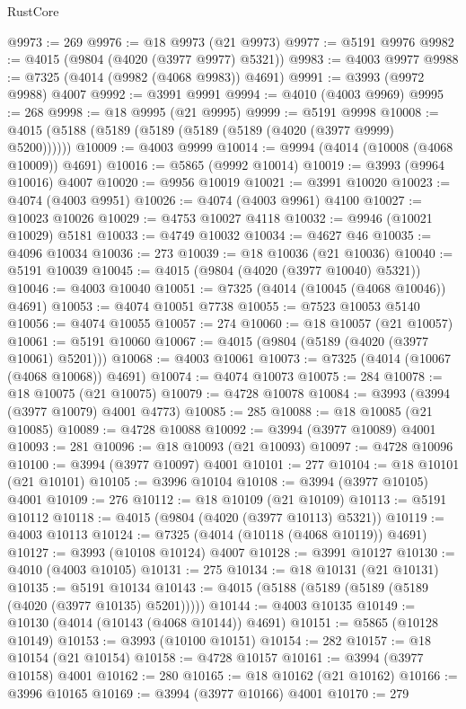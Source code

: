 \begin{lexlean}{RustCore}
\begin{coremodule}
@9973 := 269
@9976 := @18 @9973 (@21 @9973)
@9977 := @5191 @9976
@9982 := @4015 (@9804 (@4020 (@3977 @9977) @5321))
@9983 := @4003 @9977
@9988 := @7325 (@4014 (@9982 (@4068 @9983)) @4691)
@9991 := @3993 (@9972 @9988) @4007
@9992 := @3991 @9991
@9994 := @4010 (@4003 @9969)
@9995 := 268
@9998 := @18 @9995 (@21 @9995)
@9999 := @5191 @9998
@10008 := @4015 (@5188 (@5189 (@5189 (@5189 (@5189 (@4020 (@3977 @9999) @5200))))))
@10009 := @4003 @9999
@10014 := @9994 (@4014 (@10008 (@4068 @10009)) @4691)
@10016 := @5865 (@9992 @10014)
@10019 := @3993 (@9964 @10016) @4007
@10020 := @9956 @10019
@10021 := @3991 @10020
@10023 := @4074 (@4003 @9951)
@10026 := @4074 (@4003 @9961) @4100
@10027 := @10023 @10026
@10029 := @4753 @10027 @4118
@10032 := @9946 (@10021 @10029) @5181
@10033 := @4749 @10032
@10034 := @4627 @46
@10035 := @4096 @10034
@10036 := 273
@10039 := @18 @10036 (@21 @10036)
@10040 := @5191 @10039
@10045 := @4015 (@9804 (@4020 (@3977 @10040) @5321))
@10046 := @4003 @10040
@10051 := @7325 (@4014 (@10045 (@4068 @10046)) @4691)
@10053 := @4074 @10051 @7738
@10055 := @7523 @10053 @5140
@10056 := @4074 @10055
@10057 := 274
@10060 := @18 @10057 (@21 @10057)
@10061 := @5191 @10060
@10067 := @4015 (@9804 (@5189 (@4020 (@3977 @10061) @5201)))
@10068 := @4003 @10061
@10073 := @7325 (@4014 (@10067 (@4068 @10068)) @4691)
@10074 := @4074 @10073
@10075 := 284
@10078 := @18 @10075 (@21 @10075)
@10079 := @4728 @10078
@10084 := @3993 (@3994 (@3977 @10079) @4001 @4773)
@10085 := 285
@10088 := @18 @10085 (@21 @10085)
@10089 := @4728 @10088
@10092 := @3994 (@3977 @10089) @4001
@10093 := 281
@10096 := @18 @10093 (@21 @10093)
@10097 := @4728 @10096
@10100 := @3994 (@3977 @10097) @4001
@10101 := 277
@10104 := @18 @10101 (@21 @10101)
@10105 := @3996 @10104
@10108 := @3994 (@3977 @10105) @4001
@10109 := 276
@10112 := @18 @10109 (@21 @10109)
@10113 := @5191 @10112
@10118 := @4015 (@9804 (@4020 (@3977 @10113) @5321))
@10119 := @4003 @10113
@10124 := @7325 (@4014 (@10118 (@4068 @10119)) @4691)
@10127 := @3993 (@10108 @10124) @4007
@10128 := @3991 @10127
@10130 := @4010 (@4003 @10105)
@10131 := 275
@10134 := @18 @10131 (@21 @10131)
@10135 := @5191 @10134
@10143 := @4015 (@5188 (@5189 (@5189 (@5189 (@4020 (@3977 @10135) @5201)))))
@10144 := @4003 @10135
@10149 := @10130 (@4014 (@10143 (@4068 @10144)) @4691)
@10151 := @5865 (@10128 @10149)
@10153 := @3993 (@10100 @10151)
@10154 := 282
@10157 := @18 @10154 (@21 @10154)
@10158 := @4728 @10157
@10161 := @3994 (@3977 @10158) @4001
@10162 := 280
@10165 := @18 @10162 (@21 @10162)
@10166 := @3996 @10165
@10169 := @3994 (@3977 @10166) @4001
@10170 := 279

\end{coremodule}
\end{lexlean}
